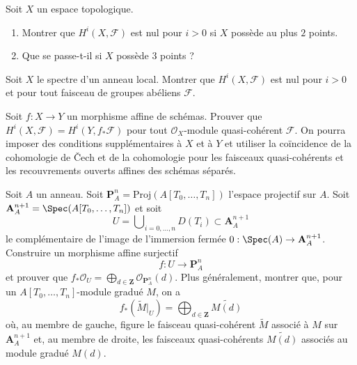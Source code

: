 \begin{exercise}
\label{exercise-cohomology-two-point-space}
Soit $X$ un espace topologique.
\begin{enumerate}
\item Montrer que $H^i(X, \mathcal{F})$ est nul pour $i > 0$
si $X$ possède au plus $2$ points.
\item Que se passe-t-il si $X$ possède $3$ points ?
\end{enumerate}
\end{exercise}

\begin{exercise}
\label{exercise-cohomology-spec-local-ring}
Soit $X$ le spectre d'un anneau local. Montrer que
$H^i(X, \mathcal{F})$ est nul pour $i > 0$ et pour tout
faisceau de groupes abéliens $\mathcal{F}$.
\end{exercise}

\begin{exercise}
\label{exercise-affine-morphism}
Soit $f : X \to Y$ un morphisme affine de schémas.
Prouver que $H^i(X, \mathcal{F}) = H^i(Y, f_*\mathcal{F})$
pour tout $\mathcal{O}_X$-module quasi-cohérent $\mathcal{F}$.
On pourra imposer des conditions supplémentaires à $X$ et à $Y$
et utiliser la coïncidence de la cohomologie de {\v C}ech et de la cohomologie
pour les faisceaux quasi-cohérents et les recouvrements ouverts affines des schémas séparés.
\end{exercise}

\begin{exercise}
\label{exercise-affine-morphism-to-Pn}
Soit $A$ un anneau. Soit $\mathbf{P}^n_A = \text{Proj}(A[T_0, \ldots, T_n])$
l'espace projectif sur $A$. Soit
$\mathbf{A}^{n + 1}_A = \Spec(A[T_0, \ldots, T_n])$ et soit
$$
U = \bigcup\nolimits_{i = 0, \ldots, n} D(T_i) \subset \mathbf{A}^{n + 1}_A
$$
le complémentaire de l'image de l'immersion fermée
$0 : \Spec(A) \to \mathbf{A}^{n + 1}_A$.
Construire un morphisme affine surjectif
$$
f : U \longrightarrow \mathbf{P}^n_A
$$
et prouver que $f_*\mathcal{O}_U =
\bigoplus_{d \in \mathbf{Z}} \mathcal{O}_{\mathbf{P}^n_A}(d)$.
Plus généralement, montrer que, pour un $A[T_0, \ldots, T_n]$-module gradué $M$,
on a
$$
f_*(\widetilde{M}|_U) =
\bigoplus\nolimits_{d \in \mathbf{Z}} \widetilde{M(d)}
$$
où, au membre de gauche, figure le faisceau quasi-cohérent
$\widetilde{M}$ associé à $M$ sur $\mathbf{A}^{n + 1}_A$
et, au membre de droite, les faisceaux quasi-cohérents
$\widetilde{M(d)}$ associés au module gradué $M(d)$.
\end{exercise}

